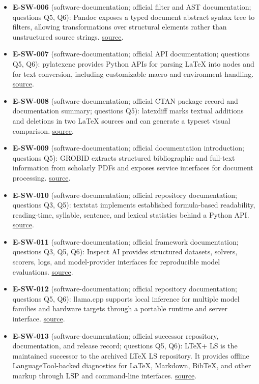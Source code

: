 \documentclass[11pt]{article}
\begin{document}
\begin{itemize}
\item
  \textbf{E-SW-006} (software-documentation; official filter and AST documentation; questions Q5, Q6): Pandoc exposes a typed document abstract syntax tree to filters, allowing transformations over structural elements rather than unstructured source strings. \href{https://pandoc.org/filters.html}{source}.
\item
  \textbf{E-SW-007} (software-documentation; official API documentation; questions Q5, Q6): pylatexenc provides Python APIs for parsing LaTeX into nodes and for text conversion, including customizable macro and environment handling. \href{https://pylatexenc.readthedocs.io/en/latest/}{source}.
\item
  \textbf{E-SW-008} (software-documentation; official CTAN package record and documentation summary; questions Q5): latexdiff marks textual additions and deletions in two LaTeX sources and can generate a typeset visual comparison. \href{https://www.ctan.org/pkg/latexdiff}{source}.
\item
  \textbf{E-SW-009} (software-documentation; official documentation introduction; questions Q5): GROBID extracts structured bibliographic and full-text information from scholarly PDFs and exposes service interfaces for document processing. \href{https://grobid.readthedocs.io/en/latest/Introduction/}{source}.
\item
  \textbf{E-SW-010} (software-documentation; official repository documentation; questions Q3, Q5): textstat implements established formula-based readability, reading-time, syllable, sentence, and lexical statistics behind a Python API. \href{https://github.com/textstat/textstat}{source}.
\item
  \textbf{E-SW-011} (software-documentation; official framework documentation; questions Q3, Q5, Q6): Inspect AI provides structured datasets, solvers, scorers, logs, and model-provider interfaces for reproducible model evaluations. \href{https://inspect.aisi.org.uk/}{source}.
\item
  \textbf{E-SW-012} (software-documentation; official repository documentation; questions Q5, Q6): llama.cpp supports local inference for multiple model families and hardware targets through a portable runtime and server interface. \href{https://github.com/ggml-org/llama.cpp}{source}.
\item
  \textbf{E-SW-013} (software-documentation; official successor repository, documentation, and release record; questions Q5, Q6): LTeX+ LS is the maintained successor to the archived LTeX LS repository. It provides offline LanguageTool-backed diagnostics for LaTeX, Markdown, BibTeX, and other markup through LSP and command-line interfaces. \href{https://github.com/ltex-plus/ltex-ls-plus}{source}.

\end{itemize}
\end{document}
